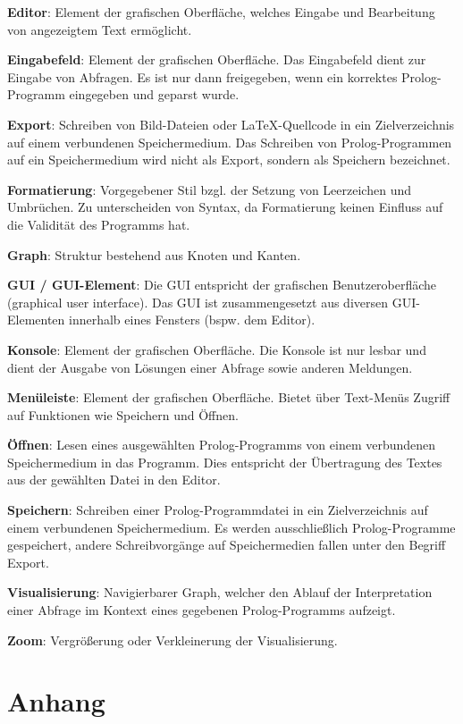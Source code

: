 \documentclass[parskip=full,11pt,twoside]{scrartcl}
\begin{document}
\textbf{Editor}:
Element der grafischen Oberfläche, welches Eingabe und Bearbeitung von angezeigtem Text ermöglicht.

\textbf{Eingabefeld}:
Element der grafischen Oberfläche. Das Eingabefeld dient zur Eingabe von Abfragen. Es ist nur dann freigegeben, wenn ein korrektes Prolog-Programm eingegeben und geparst wurde.

\textbf{Export}:
Schreiben von Bild-Dateien oder LaTeX-Quellcode in ein Zielverzeichnis auf einem verbundenen Speichermedium. Das Schreiben von Prolog-Programmen auf ein Speichermedium wird nicht als Export, sondern als Speichern bezeichnet.

\textbf{Formatierung}:
Vorgegebener Stil bzgl. der Setzung von Leerzeichen und Umbrüchen. Zu unterscheiden von Syntax, da Formatierung keinen Einfluss auf die Validität des Programms hat.

\textbf{Graph}:
Struktur bestehend aus Knoten und Kanten.

\textbf{GUI / GUI-Element}:
Die GUI entspricht der grafischen Benutzeroberfläche (graphical user interface). Das GUI ist zusammengesetzt aus diversen GUI-Elementen innerhalb eines Fensters (bspw. dem Editor).

\textbf{Konsole}:
Element der grafischen Oberfläche. Die Konsole ist nur lesbar und dient der Ausgabe von Lösungen einer Abfrage sowie anderen Meldungen. 

\textbf{Menüleiste}:
Element der grafischen Oberfläche. Bietet über Text-Menüs Zugriff auf Funktionen wie Speichern und Öffnen.

\textbf{Öffnen}:
Lesen eines ausgewählten Prolog-Programms von einem verbundenen Speichermedium in das Programm. Dies entspricht der Übertragung des Textes aus der gewählten Datei in den Editor.

\textbf{Speichern}:
Schreiben einer Prolog-Programmdatei in ein Zielverzeichnis auf einem verbundenen Speichermedium. Es werden ausschließlich Prolog-Programme gespeichert, andere Schreibvorgänge auf Speichermedien fallen unter den Begriff Export.

\textbf{Visualisierung}:
Navigierbarer Graph, welcher den Ablauf der Interpretation einer Abfrage im Kontext eines gegebenen Prolog-Programms aufzeigt.

\textbf{Zoom}:
Vergrößerung oder Verkleinerung der Visualisierung.

\newpage
\section{Anhang}
\end{document}
